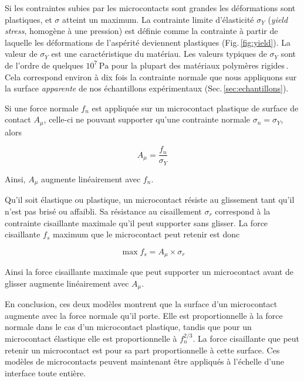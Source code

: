 Si les contraintes subies par les microcontacts sont grandes les déformations sont plastiques, et $\sigma$ atteint un maximum. La contrainte limite d'élasticité $\sigma_Y$ (\textit{yield stress}, homogène à une pression) est définie comme la contrainte à partir de laquelle les déformations de l'aspérité deviennent plastiques (Fig.\,\ref{fig:yield}). La valeur de $\sigma_Y$ est une caractéristique du matériau. Les valeurs typiques de $\sigma_Y$ sont de l'ordre de quelques $10^7\,\text{Pa}$ pour la plupart des matériaux polymères rigides\,\cite{avallone_marks_2006}. Cela correspond environ à dix fois la contrainte normale que nous appliquons sur la surface \textit{apparente} de nos échantillons expérimentaux (Sec.\,\ref{sec:echantillons}).

Si une force normale $f_n$ est appliquée sur un microcontact plastique de surface de contact $A_{\mu}$, celle-ci ne pouvant supporter qu'une contrainte normale $\sigma_n=\sigma_Y$, alors

\begin{equation}
A_\mu = \frac{f_n}{\sigma_Y}
\label{eq:microcontact}
\end{equation}

Ainsi, $A_\mu$ augmente linéairement avec $f_n$.



Qu'il soit élastique ou plastique, un microcontact résiste au glissement tant qu'il n'est pas brisé ou affaibli. Sa résistance au cisaillement $\sigma_r$ correspond à la contrainte cisaillante maximale qu'il peut supporter sans glisser. La force cisaillante $f_s$ maximum que le microcontact peut retenir est donc

\begin{equation}
\max f_s = A_\mu\times \sigma_r
\end{equation}

Ainsi la force cisaillante maximale que peut supporter un microcontact avant de glisser augmente linéairement avec $A_\mu$.

\pagebreak

En conclusion, ces deux modèles montrent que la surface d'un microcontact augmente avec la force normale qu'il porte. Elle est proportionnelle à la force normale dans le cas d'un microcontact plastique, tandis que pour un microcontact élastique elle est proportionnelle à $f_n^{2/3}$. La force cisaillante que peut retenir un microcontact est pour sa part proportionnelle à cette surface. Ces modèles de microcontacts peuvent maintenant être appliqués à l'échelle d'une interface toute entière.




